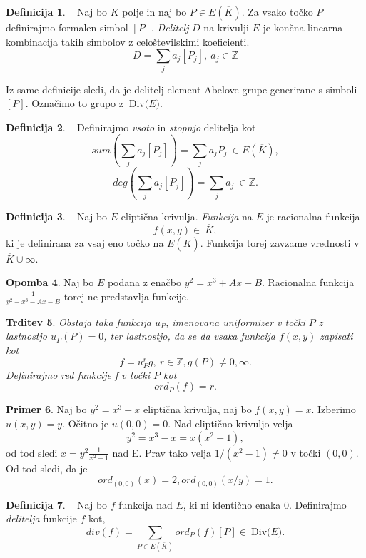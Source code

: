 \documentclass[12pt,a4paper,twoside]{article}
\theoremstyle{definition} %
\newtheorem{definicija}{Definicija}[section]
\newtheorem{primer}[definicija]{Primer}
\newtheorem{opomba}[definicija]{Opomba}
\theoremstyle{plain} %
\newtheorem{trditev}[definicija]{Trditev}
\numberwithin{equation}{section}  %
\newcommand{\Z}{\mathbb Z}
\newcommand{\E}[1]{E({#1})}
\newcommand{\DIV}[1]{\ \text{Div(}{#1}\text{)}}
\begin{document}
\begin{definicija}~
Naj bo $K$ polje in naj bo $P \in \E{\overline{K}}$. Za vsako točko $P$ definirajmo formalen simbol $[P]$. \emph{Delitelj} $D$ na krivulji $E$ je končna linearna kombinacija takih simbolov z celoštevilskimi koeficienti.
$$D = \sum_{j}a_j[P_j], \ a_j \in \Z $$

\end{definicija}

Iz same definicije sledi, da je delitelj element Abelove grupe generirane s simboli $[P]$. Označimo to grupo z $\DIV{E}$.


\begin{definicija}~
Definirajmo \emph{vsoto} in \emph{stopnjo} delitelja kot
$$sum(\sum_{j}a_j[P_j]) = \sum_ja_jP_j \ \in \E{\overline{K}},$$
$$deg(\sum_{j}a_j[P_j]) = \sum_ja_j \ \in \Z.$$

\end{definicija}


\begin{definicija}~
Naj bo $E$ eliptična krivulja. \emph{Funkcija} na $E$ je racionalna funkcija $$f(x,y) \in \ \overline{K},$$ ki je definirana za vsaj eno točko na $\E{\overline{K}}$. Funkcija torej zavzame vrednosti v $\overline{K} \cup {\infty}$.
\end{definicija}

\begin{opomba}
Naj bo $E$ podana z enačbo $y^2 = x^3+Ax+B$. Racionalna funkcija $\frac{1}{y^2-x^3-Ax-B}$ torej ne predstavlja funkcije.

\end{opomba}

\begin{trditev}
Obstaja taka funkcija $u_P$, imenovana \emph{uniformizer} v točki $P$ z lastnostjo $u_P(P) = 0$, ter lastnostjo, da se da vsaka funkcija $f(x,y)$ zapisati kot
$$f = u^r_Pg, \ r\in \Z, g(P) \neq 0,\infty.$$
Definirajmo \emph{red} funkcije f v točki $P$ kot
$$ord_P(f)=r.$$
\end{trditev}

\begin{primer}
Naj bo $y^2 = x^3-x$ eliptična krivulja, naj bo $f(x,y) = x$. Izberimo $u(x,y) = y$. Očitno je $u(0,0) = 0$. Nad eliptično krivuljo velja 
$$y^2 = x^3-x = x(x^2-1),$$ 
od tod sledi $x = y^2\frac{1}{x^2-1}$ nad E.
Prav tako velja $1/(x^2-1) \neq 0$ v točki $(0,0)$. Od tod sledi, da je 
$$ord_{(0,0)}(x) = 2, ord_{(0,0)}(x/y) = 1.$$
\end{primer}

\begin{definicija}~
Naj bo $f$ funkcija nad $E$, ki ni identično enaka $0$. Definirajmo \emph{delitelja} funkcije $f$ kot,
$$div(f) = \sum_{P\in \E{\overline{K}}} ord_P(f)[P] \in \DIV{E}.$$
\end{definicija}
\end{document}
